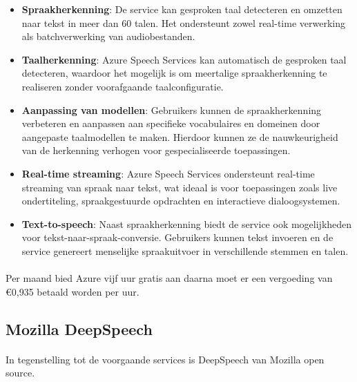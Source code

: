 \begin{itemize}
    \item \textbf{Spraakherkenning}: De service kan gesproken taal detecteren en omzetten naar tekst in meer dan 60 talen. Het ondersteunt zowel real-time verwerking als batchverwerking van audiobestanden.

    \item \textbf{Taalherkenning}: Azure Speech Services kan automatisch de gesproken taal detecteren, waardoor het mogelijk is om meertalige spraakherkenning te realiseren zonder voorafgaande taalconfiguratie.

    \item \textbf{Aanpassing van modellen}: Gebruikers kunnen de spraakherkenning verbeteren en aanpassen aan specifieke vocabulaires en domeinen door aangepaste taalmodellen te maken. Hierdoor kunnen ze de nauwkeurigheid van de herkenning verhogen voor gespecialiseerde toepassingen.

    \item \textbf{Real-time streaming}: Azure Speech Services ondersteunt real-time streaming van spraak naar tekst, wat ideaal is voor toepassingen zoals live ondertiteling, spraakgestuurde opdrachten en interactieve dialoogsystemen.

    \item \textbf{Text-to-speech}: Naast spraakherkenning biedt de service ook mogelijkheden voor tekst-naar-spraak-conversie. Gebruikers kunnen tekst invoeren en de service genereert menselijke spraakuitvoer in verschillende stemmen en talen.
\end{itemize}

\paragraph{}
Per maand bied Azure vijf uur gratis aan daarna moet er een vergoeding van €0,935 betaald worden per uur.

\subsection{Mozilla DeepSpeech}%

\paragraph{}
In tegenstelling tot de voorgaande services is DeepSpeech van Mozilla open source.

